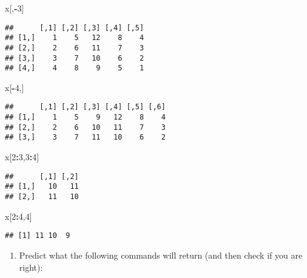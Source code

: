 \documentclass[]{article}
\newenvironment{Shaded}{\begin{snugshade}}{\end{snugshade}}
\newcommand{\DecValTok}[1]{\textcolor[rgb]{0.00,0.00,0.81}{#1}}
\newcommand{\OperatorTok}[1]{\textcolor[rgb]{0.81,0.36,0.00}{\textbf{#1}}}
\newcommand{\NormalTok}[1]{#1}
\providecommand{\tightlist}{%
  \setlength{\itemsep}{0pt}\setlength{\parskip}{0pt}}
\begin{document}
\begin{Shaded}
\begin{Highlighting}[]
\NormalTok{x[,}\OperatorTok{-}\DecValTok{3}\NormalTok{]}
\end{Highlighting}
\end{Shaded}

\begin{verbatim}
##      [,1] [,2] [,3] [,4] [,5]
## [1,]    1    5   12    8    4
## [2,]    2    6   11    7    3
## [3,]    3    7   10    6    2
## [4,]    4    8    9    5    1
\end{verbatim}

\begin{Shaded}
\begin{Highlighting}[]
\NormalTok{x[}\OperatorTok{-}\DecValTok{4}\NormalTok{,]}
\end{Highlighting}
\end{Shaded}

\begin{verbatim}
##      [,1] [,2] [,3] [,4] [,5] [,6]
## [1,]    1    5    9   12    8    4
## [2,]    2    6   10   11    7    3
## [3,]    3    7   11   10    6    2
\end{verbatim}

\begin{Shaded}
\begin{Highlighting}[]
\NormalTok{x[}\DecValTok{2}\OperatorTok{:}\DecValTok{3}\NormalTok{,}\DecValTok{3}\OperatorTok{:}\DecValTok{4}\NormalTok{]}
\end{Highlighting}
\end{Shaded}

\begin{verbatim}
##      [,1] [,2]
## [1,]   10   11
## [2,]   11   10
\end{verbatim}

\begin{Shaded}
\begin{Highlighting}[]
\NormalTok{x[}\DecValTok{2}\OperatorTok{:}\DecValTok{4}\NormalTok{,}\DecValTok{4}\NormalTok{]}
\end{Highlighting}
\end{Shaded}

\begin{verbatim}
## [1] 11 10  9
\end{verbatim}

\begin{enumerate}
\def\labelenumi{\arabic{enumi}.}
\setcounter{enumi}{1}
\tightlist
\item
  Predict what the following commands will return (and then check if you
  are right):
\end{enumerate}
\end{document}
